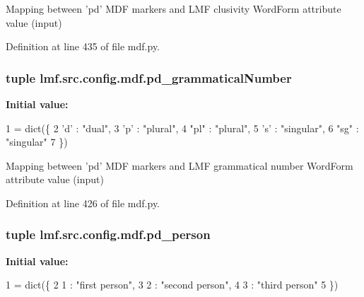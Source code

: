Mapping between 'pd' M\+D\+F markers and L\+M\+F clusivity Word\+Form attribute value (input) 



Definition at line 435 of file mdf.\+py.

\hypertarget{namespacelmf_1_1src_1_1config_1_1mdf_a64be26974728c369cd72ef80bd297154}{
\subsubsection[{pd\+\_\+grammatical\+Number}]{\setlength{\rightskip}{0pt plus 5cm}tuple lmf.\+src.\+config.\+mdf.\+pd\+\_\+grammatical\+Number}}\label{namespacelmf_1_1src_1_1config_1_1mdf_a64be26974728c369cd72ef80bd297154}
{\bfseries Initial value\+:}
\begin{DoxyCode}
1 = dict(\{
2     \textcolor{stringliteral}{'d'}     : \textcolor{stringliteral}{"dual"},
3     \textcolor{stringliteral}{'p'}     : \textcolor{stringliteral}{"plural"},
4     \textcolor{stringliteral}{"pl"}    : \textcolor{stringliteral}{"plural"},
5     \textcolor{stringliteral}{'s'}     : \textcolor{stringliteral}{"singular"},
6     \textcolor{stringliteral}{"sg"}    : \textcolor{stringliteral}{"singular"}
7 \})
\end{DoxyCode}


Mapping between 'pd' M\+D\+F markers and L\+M\+F grammatical number Word\+Form attribute value (input) 



Definition at line 426 of file mdf.\+py.

\hypertarget{namespacelmf_1_1src_1_1config_1_1mdf_ab58fb9b58bc32ac36efe9b26e4ea3ca2}{
\subsubsection[{pd\+\_\+person}]{\setlength{\rightskip}{0pt plus 5cm}tuple lmf.\+src.\+config.\+mdf.\+pd\+\_\+person}}\label{namespacelmf_1_1src_1_1config_1_1mdf_ab58fb9b58bc32ac36efe9b26e4ea3ca2}
{\bfseries Initial value\+:}
\begin{DoxyCode}
1 = dict(\{
2     1 : \textcolor{stringliteral}{"first person"},
3     2 : \textcolor{stringliteral}{"second person"},
4     3 : \textcolor{stringliteral}{"third person"}
5 \})
\end{DoxyCode}


